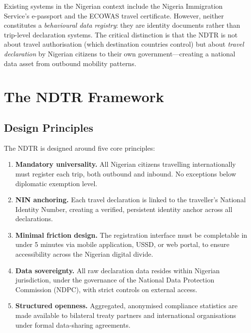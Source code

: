 \documentclass[11pt]{article}
\begin{document}
Existing systems in the Nigerian context include the Nigeria Immigration
Service's e-passport and the ECOWAS travel certificate. However, neither
constitutes a \textit{behavioural data registry}: they are identity
documents rather than trip-level declaration systems. The critical
distinction is that the NDTR is not about travel authorisation
(which destination countries control) but about \textit{travel declaration}
by Nigerian citizens to their own government---creating a national data
asset from outbound mobility patterns.

\section{The NDTR Framework}
\label{sec:framework}

\subsection{Design Principles}

The NDTR is designed around five core principles:

\begin{enumerate}[label=\textbf{P\arabic*.}, leftmargin=*]
  \item \textbf{Mandatory universality.} All Nigerian citizens travelling
  internationally must register each trip, both outbound and inbound.
  No exceptions below diplomatic exemption level.

  \item \textbf{NIN anchoring.} Each travel declaration is linked to the
  traveller's National Identity Number, creating a verified, persistent
  identity anchor across all declarations.

  \item \textbf{Minimal friction design.} The registration interface must
  be completable in under 5 minutes via mobile application, USSD, or
  web portal, to ensure accessibility across the Nigerian digital
  divide.

  \item \textbf{Data sovereignty.} All raw declaration data resides within
  Nigerian jurisdiction, under the governance of the National Data
  Protection Commission (NDPC), with strict controls on external access.

  \item \textbf{Structured openness.} Aggregated, anonymised compliance
  statistics are made available to bilateral treaty partners and
  international organisations under formal data-sharing agreements.
\end{enumerate}
\end{document}
